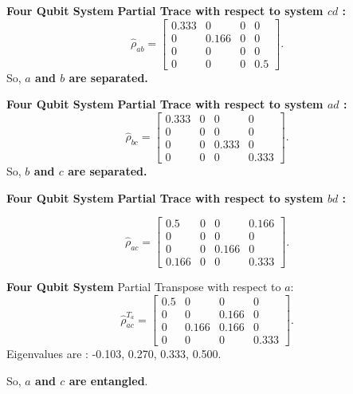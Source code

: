 \documentclass[usenames,dvipsnames]{beamer}
\begin{document}
		\begin{frame}{\textbf{Four Qubit System}}
			\textbf{Partial Trace with respect to system $cd$ :}
			\begin{equation*}
				\hat{\rho}_{ab} = \left[\begin{matrix}0.333 & 0 & 0 & 0\\0 & 0.166 & 0 & 0\\0 & 0 & 0 & 0\\0 & 0 & 0 & 0.5\end{matrix}\right]
				.
			\end{equation*}
		So, \textbf{$a$ and $b$ are separated.}
		\end{frame}
		\begin{frame}{\textbf{Four Qubit System}}
			\textbf{Partial Trace with respect to system $ad$ :}
			\begin{equation*}
				\hat{\rho}_{bc} = \left[\begin{matrix}0.333 & 0 & 0 & 0\\0 & 0 & 0 & 0\\0 & 0 & 0.333 & 0\\0 & 0 & 0 & 0.333\end{matrix}\right]
				.
			\end{equation*}
		So, \textbf{$b$ and $c$ are separated.}
		\end{frame}
		\begin{frame}{\textbf{Four Qubit System}}
			\textbf{Partial Trace with respect to system $bd$ :}
			
			\begin{equation*}
				\hat{\rho}_{ac} = \left[\begin{matrix}0.5 & 0 & 0 & 0.166\\0 & 0 & 0 & 0\\0 & 0 & 0.166 & 0\\0.166 & 0 & 0 & 0.333\end{matrix}\right]
				.
			\end{equation*}
		\end{frame}
		
		\begin{frame}{\textbf{Four Qubit System}}
			Partial Transpose with respect to $a$:
			\begin{equation*}
				\hat{\rho}_{ac}^{T_a} = \left[\begin{matrix}0.5 & 0 & 0 & 0\\0 & 0 & 0.166 & 0\\0 & 0.166 & 0.166 & 0\\0 & 0 & 0 & 0.333\end{matrix}\right].
			\end{equation*}
		Eigenvalues are : -0.103, 0.270, 0.333, 0.500.
		
		So, \textbf{$a$ and $c$ are entangled}.
		\end{frame}
		
\end{document}
